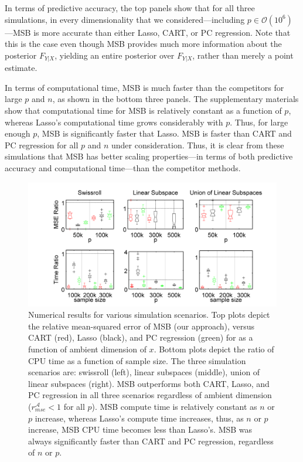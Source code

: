 \documentclass{article} %
\providecommand{\mc}[1]{\mathcal{#1}}
\begin{document}
In terms of predictive accuracy, the top panels show that for all three simulations,  in every dimensionality that we considered---including $p \in \mc{O}(10^6)$---MSB is more accurate than either Lasso, CART, or PC regression.  Note that this is the case even though MSB provides much more information about the posterior $F_{Y|X}$, yielding an entire posterior over $F_{Y|X}$, rather than merely a point estimate.

In terms of computational time, MSB is much faster than the competitors for large $p$ and $n$, as shown in the bottom three panels.  The supplementary materials show that computational time for MSB is relatively constant as a function of $p$, whereas Lasso's computational time grows considerably with $p$.  Thus, for large enough $p$, MSB is significantly faster that Lasso.  MSB is faster than CART and PC regression for all $p$ and $n$ under consideration.  Thus, it is clear from these simulations that MSB has better scaling properties---in terms of both predictive accuracy and computational time---than the competitor methods. 



\begin{figure}[h!]
\centering
 \vskip -0pt 
\includegraphics[width=1.0\linewidth]{../figs/boxplots.png}
 \vskip -10pt 
\caption{
Numerical results for various simulation scenarios.  Top plots depict the relative mean-squared error of MSB (our approach), versus CART (red), Lasso (black), and PC regression (green) for as a function of ambient dimension of $x$.  
Bottom plots depict the ratio of CPU time as a function of sample size.
The three simulation scenarios are: 
swissroll (left),
linear subspaces (middle), 
union of linear subspaces (right). 
MSB outperforms both CART, Lasso, and PC regression in all three scenarios regardless of ambient dimension ($r_{mse}^{\mc{A}}< 1$ for all $p$).  MSB compute time is relatively constant as $n$ or $p$ increase, whereas Lasso's compute time increases, thus, as $n$ or $p$ increase, MSB CPU time becomes less than Lasso's.  MSB was always significantly faster than CART and PC regression, regardless of $n$ or $p$. } 

\label{fig:boxplots}
\end{figure}
\end{document}
